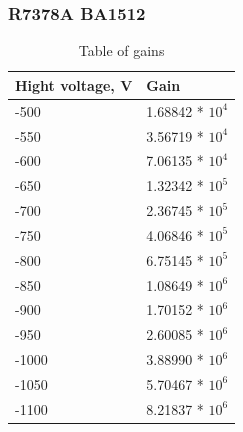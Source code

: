 \documentclass{beamer}
\begin{document}
\begin{frame}
\frametitle{R7378A BA1512}
\begin{table}
\begin{tabular}{l l}
\toprule
\textbf{Hight voltage, V} & \textbf{Gain} \\
\midrule
-500 &  1.68842 * $10^4$\\
-550 &  3.56719 * $10^4$\\
-600 &  7.06135 * $10^4$\\
-650 &  1.32342 * $10^5$\\
-700 &  2.36745 * $10^5$\\
-750 &  4.06846 * $10^5$\\
-800 &  6.75145 * $10^5$\\
-850 &  1.08649 * $10^6$\\
-900 &  1.70152 * $10^6$\\
-950 &  2.60085 * $10^6$\\
-1000 &  3.88990 * $10^6$\\
-1050 &  5.70467 * $10^6$\\
-1100 &  8.21837 * $10^6$\\
\bottomrule
\end{tabular}
\caption{Table of gains}
\end{table}
\end{frame}
\end{document}
